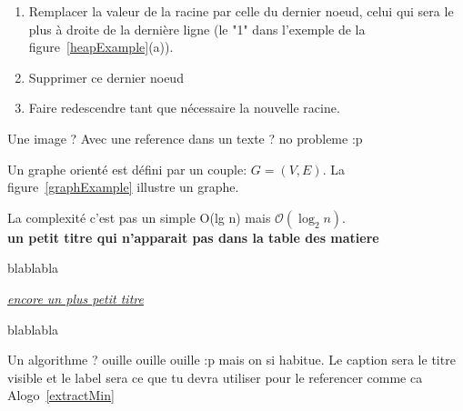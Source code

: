 \documentclass[12pt,a4paper,final]{article}
\newcommand{\smalltitle}[1]{\bigskip\large\textbf{#1}\par\normalsize\medskip}
\newcommand{\partitle}[1]{\bigskip\textit{\underline{#1}}\par\medskip}
\begin{document}
\begin{enumerate}
\item Remplacer la valeur de la racine par celle du dernier noeud, celui qui sera le plus à droite de la dernière ligne (le "1" dans l'exemple de la figure~\ref{heapExample}(a)).
\item Supprimer ce dernier noeud
\item Faire redescendre tant que nécessaire la nouvelle racine.
\end{enumerate}
Une image ? Avec une reference dans un texte ? no probleme :p

Un graphe orienté est défini par un couple: $G=(V,E)$.
La figure~\ref{graphExample} illustre un graphe.

La complexité c'est pas un simple O(lg n) mais $\mathcal{O}(\log_2 n)$.\\

\smalltitle{un petit titre qui n'apparait pas dans la table des matiere}
blablabla

\partitle{encore un plus petit titre}
blablabla

Un algorithme ? ouille ouille ouille :p mais on si habitue. Le caption sera le titre visible et le label sera ce que tu devra utiliser pour le referencer comme ca Alogo~\ref{extractMin}



\end{document}
